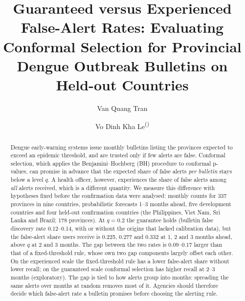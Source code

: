 \documentclass[runningheads]{llncs}
\begin{document}
\title{Guaranteed versus Experienced False-Alert Rates: Evaluating Conformal Selection for Provincial Dengue Outbreak Bulletins on Held-out Countries}

\author{Van Quang Tran \and
Vo Dinh Kha Le\textsuperscript{(\Letter)}}


\maketitle

\begin{abstract}
Dengue early-warning systems issue monthly bulletins listing the provinces expected to exceed an epidemic threshold, and are trusted only if few alerts are false. Conformal selection, which applies the Benjamini--Hochberg (BH) procedure to conformal p-values, can promise in advance that the expected share of false alerts \emph{per bulletin} stays below a level $q$. A health officer, however, experiences the share of false alerts among \emph{all} alerts received, which is a different quantity. We measure this difference with hypotheses fixed before the confirmation data were analysed: monthly counts for 337 provinces in nine countries, probabilistic forecasts 1--3 months ahead, five development countries and four held-out confirmation countries (the Philippines, Viet Nam, Sri Lanka and Brazil; 178 provinces). At $q=0.2$ the guarantee holds (bulletin false discovery rate 0.12--0.14, with or without the origins that lacked calibration data), but the false-alert share users receive is 0.225, 0.277 and 0.332 at 1, 2 and 3 months ahead, above $q$ at 2 and 3 months. The gap between the two rates is 0.09--0.17 larger than that of a fixed-threshold rule, whose own two gap components largely offset each other. On the experienced scale the fixed-threshold rule has a lower false-alert share without lower recall; on the guaranteed scale conformal selection has higher recall at 2--3 months (exploratory). The gap is tied to how alerts group into months: spreading the same alerts over months at random removes most of it. Agencies should therefore decide which false-alert rate a bulletin promises before choosing the alerting rule.

\end{abstract}
\end{document}

